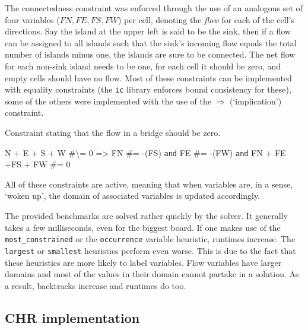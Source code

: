 The connectedness constraint was enforced through the use of an analogous set of four variables ($FN,FE,FS,FW$) per cell, denoting the \textit{flow} for each of the cell's directions. Say the island at the upper left is said to be the sink, then if a flow can be assigned to all islands such that the sink's incoming flow equals the total number of islands minus one, the islands are sure to be connected. The net flow for each non-sink island needs to be one, for each cell it should be zero, and empty cells should have no flow. Most of these constraints can be implemented with equality constraints (the \texttt{ic} library enforces bound consistency for these), some of the others were implemented with the use of the \href{http://eclipseclp.org/doc/bips/lib/ic/EG-2.html}{$\Rightarrow$} (`implication') constraint.\\\par

\begin{snippet}[H]
\caption{Constraint stating that the flow in a bridge should be zero.}\label{hashi}
\small
N + E + S + W \#\textbackslash= 0 => FN \#= -(FS) \texttt{and} FE \#= -(FW) \texttt{and} FN + FE +FS + FW \#= 0
\end{snippet}

All of these constraints are active, meaning that when variables are, in a sense, `woken up', the domain of associated variables is updated accordingly.\\\par

The provided benchmarks are solved rather quickly by the solver. It generally takes a few milliseconds, even for the biggest board. If one makes use of the \texttt{most\_constrained} or the \texttt{occurrence} variable heuristic, runtimes increase. The \texttt{largest} or \texttt{smallest} heuristics perform even worse. This is due to the fact that these heuristics are more likely to label variables. Flow variables have larger domains and most of the values in their domain cannot partake in a solution. As a result, backtracks increase and runtimes do too.

\subsection{CHR implementation}

